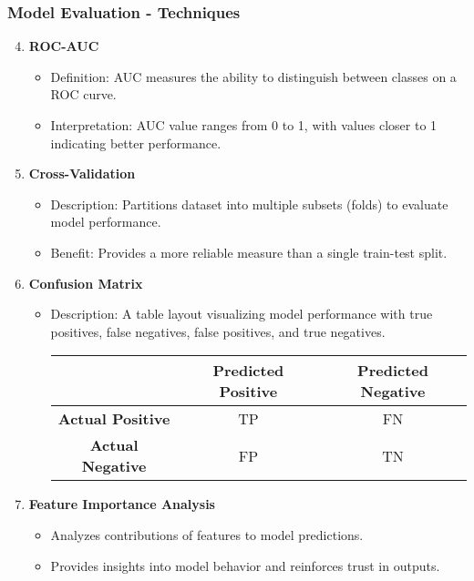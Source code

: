 \documentclass[aspectratio=169]{beamer}
\begin{document}
\begin{frame}[fragile]
    \frametitle{Model Evaluation - Techniques}
    \begin{enumerate}
        \setcounter{enumi}{3}
        \item \textbf{ROC-AUC}
            \begin{itemize}
                \item Definition: AUC measures the ability to distinguish between classes on a ROC curve.
                \item Interpretation: AUC value ranges from 0 to 1, with values closer to 1 indicating better performance.
            \end{itemize}
        
        \item \textbf{Cross-Validation}
            \begin{itemize}
                \item Description: Partitions dataset into multiple subsets (folds) to evaluate model performance.
                \item Benefit: Provides a more reliable measure than a single train-test split.
            \end{itemize}
        
        \item \textbf{Confusion Matrix}
            \begin{itemize}
                \item Description: A table layout visualizing model performance with true positives, false negatives, false positives, and true negatives.
                \begin{center}
                    \begin{tabular}{|c|c|c|}
                        \hline
                        & \textbf{Predicted Positive} & \textbf{Predicted Negative} \\
                        \hline
                        \textbf{Actual Positive} & TP & FN \\
                        \hline
                        \textbf{Actual Negative} & FP & TN \\
                        \hline
                    \end{tabular}
                \end{center}
            \end{itemize}
        \item \textbf{Feature Importance Analysis}
            \begin{itemize}
                \item Analyzes contributions of features to model predictions.
                \item Provides insights into model behavior and reinforces trust in outputs.
            \end{itemize}
    \end{enumerate}
\end{frame}
\end{document}

